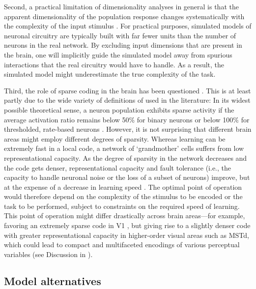 Second, a practical limitation of dimensionality analyses in general
is that the apparent dimensionality of the population response changes
systematically with the complexity of the input stimulus
\cite{SpanneJorntell2015,Cowley2016,Mazzucato2016}.
For practical purposes, simulated models of neuronal circuitry are typically
built with far fewer units than the number of neurons in the real network.
By excluding input dimensions that are present in the brain,
one will implicitly guide the simulated model away from spurious interactions
that the real circuitry would have to handle.
As a result, the simulated model might underestimate 
the true complexity of the task.

Third, the role of sparse coding in the brain has been questioned
\cite{SpanneJorntell2015,BarthPoulet2012}.
This is at least partly due to the wide variety of definitions of 
used in the literature:
In its widest possible theoretical sense,
a neuron population exhibits sparse activity if the average activation ratio
remains below 50\% for binary neurons 
or below 100\% for thresholded,
rate-based neurons \cite{SpanneJorntell2015}.
However, it is not surprising that different brain areas might employ
different degrees of sparsity.
Whereas learning can be extremely fast in a local code,
a network of `grandmother' cells suffers from low representational capacity.
As the degree of sparsity in the network decreases and the code gets denser,
representational capacity and fault tolerance 
(i.e., the capacity to handle neuronal noise or the loss of a subset of neurons)
improve,
but at the expense of a decrease in learning speed
\cite{Foldiak1990,SpanneJorntell2015}.
The optimal point of operation would therefore depend on the complexity of
the stimulus to be encoded or the task to be performed,
subject to constraints on the required speed of learning.
This point of operation might differ drastically across brain areas---for example,
favoring an extremely sparse code in \ac{V1}
\cite{OlshausenField1996},
but giving rise to a slightly denser code with 
greater representational capacity in higher-order visual areas
such as \ac{MSTd}, 
which could lead to compact and multifaceted encodings
of various perceptual variables
(see Discussion in \cite{Beyeler2016}).


\subsection*{Model alternatives}

